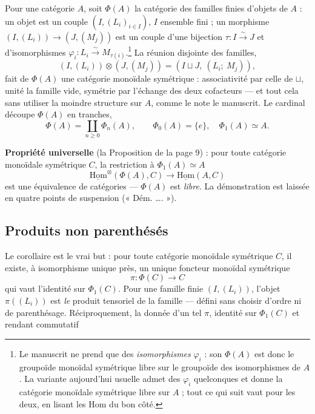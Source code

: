 \documentclass[11pt,a4paper]{article}
\begin{document}
Pour une catégorie $A$, soit $\Phi(A)$ la catégorie des familles finies
d'objets de $A$ : un objet est un couple $(I, (L_i)_{i \in I})$, $I$
ensemble fini ; un morphisme
$(I, (L_i)) \to (J, (M_j))$ est un couple d'une bijection
$\tau : I \xrightarrow{\sim} J$ et d'isomorphismes
$\varphi_i : L_i \xrightarrow{\sim} M_{\tau(i)}$.\footnote{Le manuscrit ne
prend que des \emph{isomorphismes} $\varphi_i$ : son $\Phi(A)$ est donc le
groupoïde monoïdal symétrique libre sur le groupoïde des isomorphismes de
$A$. La variante aujourd'hui usuelle admet des $\varphi_i$ quelconques et
donne la catégorie monoïdale symétrique libre sur $A$ ; tout ce qui suit
vaut pour les deux, en lisant les Hom du bon côté.} La réunion disjointe
des familles,
\[
(I, (L_i)) \otimes (J, (M_j)) = (I \sqcup J,\ (L_i;\ M_j)),
\]
fait de $\Phi(A)$ une catégorie monoïdale symétrique : associativité par
celle de $\sqcup$, unité la famille vide, symétrie par l'échange des deux
cofacteurs — et tout cela sans utiliser la moindre structure sur $A$, comme
le note le manuscrit. Le cardinal découpe $\Phi(A)$ en tranches,
\[
\Phi(A) = \coprod_{n \geq 0} \Phi_n(A), \qquad
\Phi_0(A) = \{e\}, \quad \Phi_1(A) \simeq A.
\]

\textbf{Propriété universelle} (la Proposition de la page 9) : pour toute
catégorie monoïdale symétrique $C$, la restriction à $\Phi_1(A) \simeq A$
\[
\underline{\mathrm{Hom}}^{\otimes}(\Phi(A), C) \longrightarrow
\underline{\mathrm{Hom}}(A, C)
\]
est une équivalence de catégories — $\Phi(A)$ est \emph{libre}. La
démonstration est laissée en quatre points de suspension (« Dém. …. »).

\subsection*{Produits non parenthésés}

Le corollaire est le vrai but : pour toute catégorie monoïdale symétrique
$C$, il existe, à isomorphisme unique près, un unique foncteur monoïdal
symétrique
\[
\pi : \Phi(C) \longrightarrow C
\]
qui vaut l'identité sur $\Phi_1(C)$. Pour une famille finie
$(I, (L_i))$, l'objet $\pi((L_i))$ est \emph{le} produit tensoriel de la
famille — défini sans choisir d'ordre ni de parenthésage. Réciproquement,
la donnée d'un tel $\pi$, identité sur $\Phi_1(C)$ et rendant commutatif

\end{document}
